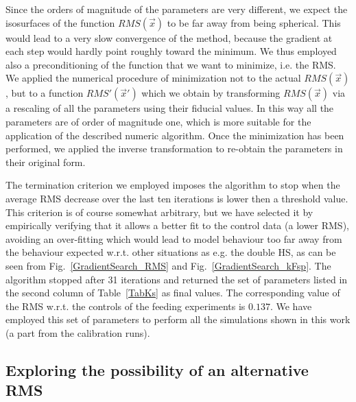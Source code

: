 \documentclass[oneside, 10pt, a4paper, twocolumn]{article}
\begin{document}
Since the orders of magnitude of the parameters are very different, we expect the isosurfaces of the function $RMS\left(\vec{x}\right)$ to be far away from being spherical. This would lead to a very slow convergence of the method, because the gradient at each step would hardly point roughly toward the minimum. We thus employed also a preconditioning of the function that we want to minimize, i.e. the RMS. We applied the numerical procedure of minimization not to the actual $RMS\left(\vec{x}\right)$, but to a function $RMS'\left(\vec{x}'\right)$ which we obtain by transforming $RMS\left(\vec{x}\right)$ via a rescaling of all the parameters using their fiducial values. In this way all the parameters are of order of magnitude one, which is more suitable for the application of the described numeric algorithm. Once the minimization has been performed, we applied the inverse transformation to re-obtain the parameters in their original form.

The termination criterion we employed imposes the algorithm to stop when the average RMS decrease over the last ten iterations is lower then a threshold value. This criterion is of course somewhat arbitrary, but we have selected it by empirically verifying that it allows a better fit to the control data (a lower RMS), avoiding an over-fitting which would lead to model behaviour too far away from the behaviour expected w.r.t. other situations as e.g. the double HS, as can be seen from Fig.~\ref{GradientSearch_RMS} and Fig.~\ref{GradientSearch_kFsp}.
The algorithm stopped after 31 iterations and returned the set of parameters listed in the second column of Table~\ref{TabKs} as final values. The corresponding value of the RMS w.r.t. the controls of the feeding experiments is $0.137$.  We have employed this set of parameters to perform all the simulations shown in this work (a part from the calibration runs).




\subsection{Exploring the possibility of an alternative RMS}
\end{document}
